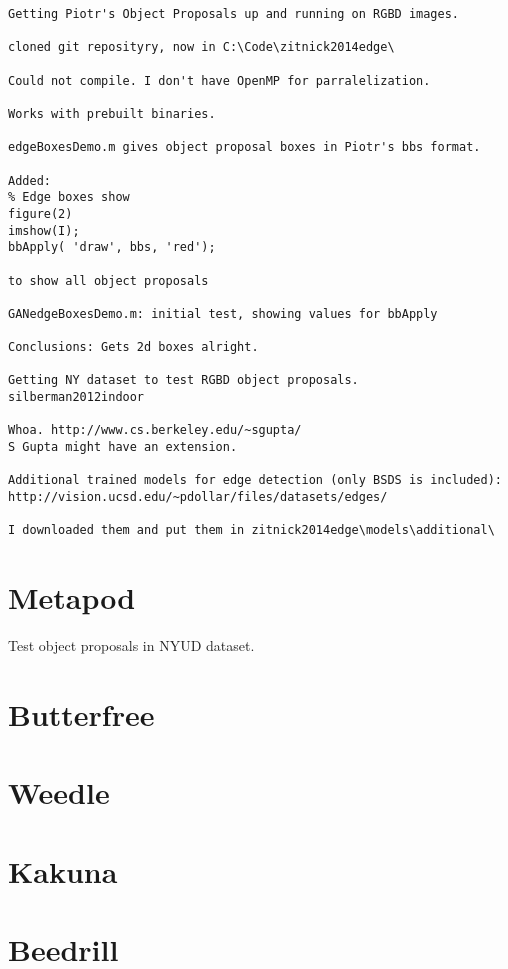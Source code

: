 \begin{lstlisting}
Getting Piotr's Object Proposals up and running on RGBD images.

cloned git reposityry, now in C:\Code\zitnick2014edge\

Could not compile. I don't have OpenMP for parralelization.

Works with prebuilt binaries.

edgeBoxesDemo.m gives object proposal boxes in Piotr's bbs format.

Added:
% Edge boxes show
figure(2)
imshow(I);
bbApply( 'draw', bbs, 'red');

to show all object proposals

GANedgeBoxesDemo.m: initial test, showing values for bbApply

Conclusions: Gets 2d boxes alright.

Getting NY dataset to test RGBD object proposals.
silberman2012indoor

Whoa. http://www.cs.berkeley.edu/~sgupta/
S Gupta might have an extension.

Additional trained models for edge detection (only BSDS is included):
http://vision.ucsd.edu/~pdollar/files/datasets/edges/

I downloaded them and put them in zitnick2014edge\models\additional\

\end{lstlisting}

\section{Metapod}
\label{exp:Metapod}
Test object proposals in NYUD dataset. 


\section{Butterfree}
\label{exp:Butterfree}
\section{Weedle}
\label{exp:Weedle}
\section{Kakuna}
\label{exp:Kakuna}
\section{Beedrill}
\label{exp:Beedrill}
